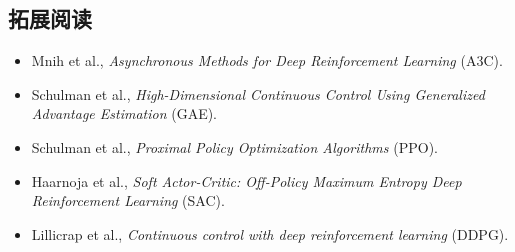 \documentclass[a4paper]{article}
\begin{document}
\subsection{拓展阅读}
\begin{itemize}
    \item Mnih et al., \textit{Asynchronous Methods for Deep Reinforcement Learning} (A3C).
    \item Schulman et al., \textit{High-Dimensional Continuous Control Using Generalized Advantage Estimation} (GAE).
    \item Schulman et al., \textit{Proximal Policy Optimization Algorithms} (PPO).
    \item Haarnoja et al., \textit{Soft Actor-Critic: Off-Policy Maximum Entropy Deep Reinforcement Learning} (SAC).
    \item Lillicrap et al., \textit{Continuous control with deep reinforcement learning} (DDPG).
\end{itemize}
\end{document}
